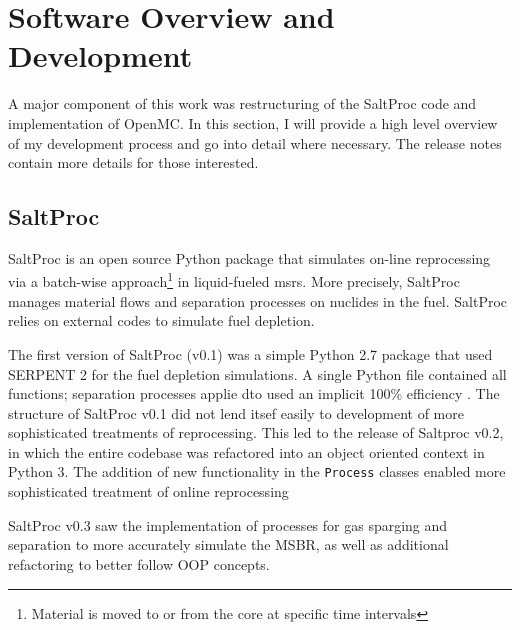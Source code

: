 \chapter{Software Overview and Development}%
\label{cha:software_development}

A major component of this work was restructuring of the SaltProc code and implementation of OpenMC. In this section, I will provide a high level overview of my development process and go into detail where necessary. The release notes contain more details for those interested.
\section{SaltProc}%
\label{sec:saltproc}

SaltProc\cite{rykhlevskii_saltproc_2018} is an open source Python package that simulates on-line reprocessing via a batch-wise approach\footnote{Material is moved to or from the core at specific time intervals} in liquid-fueled \Gls{msr}s. More precisely, SaltProc manages material flows and separation processes on nuclides in the fuel. SaltProc relies on external codes to simulate fuel depletion.

The first version of SaltProc (v0.1) was a simple Python 2.7 package that used SERPENT 2 for the fuel depletion simulations. A single Python file contained all functions; separation processes applie dto  used an implicit 100\% efficiency \cite{rykhlevskii_advanced_2018}. The structure of SaltProc v0.1 did not lend itsef easily to development of more sophisticated treatments of reprocessing. This led to the release of Saltproc v0.2, in which the entire codebase was refactored into an object oriented
context in Python 3. The addition of new functionality in the \verb.Process. classes enabled more sophisticated treatment of online reprocessing \cite{rykhlevskii_fuel_2020} 

SaltProc v0.3 saw the implementation of processes for gas sparging and separation to more accurately simulate the MSBR, as well as additional refactoring to better follow OOP concepts.


